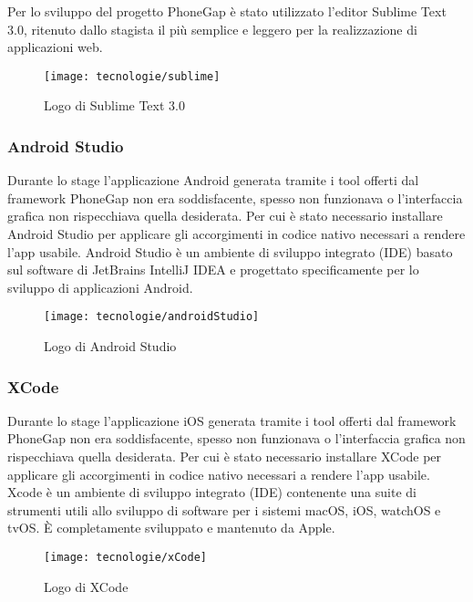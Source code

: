 Per lo sviluppo del progetto PhoneGap è stato utilizzato l'editor Sublime Text 3.0, ritenuto dallo stagista il più semplice e leggero per la realizzazione di applicazioni web. 

\begin{figure}[!h] 
    \centering 
    \texttt{[image: tecnologie/sublime]} 
    \caption{Logo di Sublime Text 3.0}
\end{figure}

\subsubsection{Android Studio}

Durante lo stage l'applicazione Android generata tramite i tool offerti dal framework PhoneGap non era soddisfacente, spesso non funzionava o l'interfaccia grafica non rispecchiava quella desiderata. Per cui è stato necessario installare Android Studio per applicare gli accorgimenti in codice nativo necessari a rendere l'app usabile. Android Studio è un ambiente di sviluppo integrato (IDE) basato sul software di JetBrains IntelliJ IDEA e progettato specificamente per lo sviluppo di applicazioni Android.

\begin{figure}[!h] 
    \centering 
    \texttt{[image: tecnologie/androidStudio]} 
    \caption{Logo di Android Studio}
\end{figure}

\subsubsection{XCode}

Durante lo stage l'applicazione iOS generata tramite i tool offerti dal framework PhoneGap non era soddisfacente, spesso non funzionava o l'interfaccia grafica non rispecchiava quella desiderata. Per cui è stato necessario installare XCode per applicare gli accorgimenti in codice nativo necessari a rendere l'app usabile. Xcode è un ambiente di sviluppo integrato (IDE) contenente una suite di strumenti utili allo sviluppo di software per i sistemi macOS, iOS, watchOS e tvOS. È completamente sviluppato e mantenuto da Apple.

\begin{figure}[!h] 
    \centering 
    \texttt{[image: tecnologie/xCode]} 
    \caption{Logo di XCode}
\end{figure}

